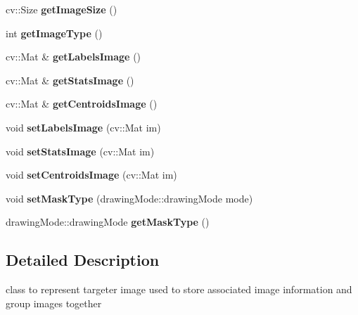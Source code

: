 \begin{DoxyCompactItemize}
\mbox{\label{classtargeter_image_a643b66c947c2edb6f38f76291eb89469}} 
cv\+::\+Size {\bfseries get\+Image\+Size} ()
\item 
\mbox{\label{classtargeter_image_aba57839705644e736af8e7eb5bbc0a18}} 
int {\bfseries get\+Image\+Type} ()
\item 
\mbox{\label{classtargeter_image_ac84ad19a329b9c13ffaedfef952872c2}} 
cv\+::\+Mat \& {\bfseries get\+Labels\+Image} ()
\item 
\mbox{\label{classtargeter_image_a9d928692de5b2650ac7494100dddf901}} 
cv\+::\+Mat \& {\bfseries get\+Stats\+Image} ()
\item 
\mbox{\label{classtargeter_image_aaa3de0344745c9b3739cf5ddb30d1b89}} 
cv\+::\+Mat \& {\bfseries get\+Centroids\+Image} ()
\item 
\mbox{\label{classtargeter_image_ada04756b972b05877424afbb952af17c}} 
void {\bfseries set\+Labels\+Image} (cv\+::\+Mat im)
\item 
\mbox{\label{classtargeter_image_ab99a3acbea5ccb634f25ae7eb8102dfa}} 
void {\bfseries set\+Stats\+Image} (cv\+::\+Mat im)
\item 
\mbox{\label{classtargeter_image_af4f171771b7457629388be5748f76136}} 
void {\bfseries set\+Centroids\+Image} (cv\+::\+Mat im)
\item 
\mbox{\label{classtargeter_image_aac06df6cfcb1f654ad7d0a2241954c81}} 
void {\bfseries set\+Mask\+Type} (drawing\+Mode\+::drawing\+Mode mode)
\item 
\mbox{\label{classtargeter_image_ae19d5c454796299cc60e09fcf5c974cf}} 
drawing\+Mode\+::drawing\+Mode {\bfseries get\+Mask\+Type} ()
\end{DoxyCompactItemize}


\subsection{Detailed Description}
class to represent targeter image used to store associated image information and group images together 

